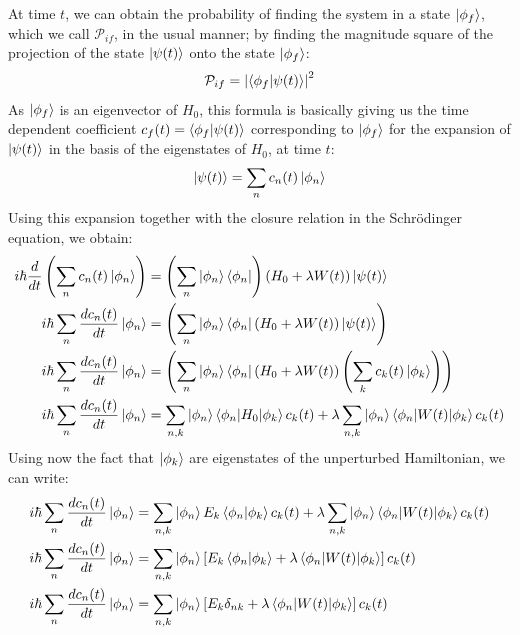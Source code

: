 At time $t$, we can obtain the probability of finding the system in a state $\ket{\phi_f}$, which we call $\mathcal{P}_{if}$, in the usual manner; by finding the magnitude square of the projection of the state $\ket{\psi(t)}$ onto the state $\ket{\phi_f}$:
\begin{equation}
    \mathcal{P}_{if} = \left|\braket{\phi_f|\psi(t)}\right|^2
\end{equation}
As $\ket{\phi_f}$ is an eigenvector of $H_0$, this formula is basically giving us the time dependent coefficient $c_f(t) = \braket{\phi_f|\psi(t)}$ corresponding to $\ket{\phi_f}$ for the expansion of $\ket{\psi(t)}$ in the basis of the eigenstates of $H_0$, at time $t$:
\begin{equation}
    \ket{\psi(t)} = \sum_n c_n(t) \ket{\phi_n}
\end{equation}
Using this expansion together with the closure relation in the Schrödinger equation, we obtain:
\begin{equation}
    \begin{split}
        i\hbar \frac{d}{dt}\left(\sum_n c_n(t) \ket{\phi_n}\right) &= \left( \sum_n \ket{\phi_n}\bra{\phi_n} \right)(H_0 + \lambda W(t)) \ket{\psi(t)}\\
        i\hbar \sum_n\frac{dc_n(t)}{dt} \ket{\phi_n} &= \left( \sum_n \ket{\phi_n}\bra{\phi_n} (H_0 + \lambda W(t)) \ket{\psi(t)}\right)\\
        i\hbar \sum_n\frac{dc_n(t)}{dt} \ket{\phi_n} &= \left( \sum_n \ket{\phi_n}\bra{\phi_n} (H_0 + \lambda W(t)) \left(\sum_k c_k(t) \ket{\phi_k}\right)\right)\\
        i\hbar \sum_n\frac{dc_n(t)}{dt} \ket{\phi_n} &= \sum_{n,k} \ket{\phi_n}\braket{\phi_n| H_0|\phi_k}c_k(t) + \lambda\sum_{n,k} \ket{\phi_n}\braket{\phi_n| W(t)|\phi_k}c_k(t)\\
    \end{split}
\end{equation}
Using now the fact that $\ket{\phi_k}$ are eigenstates of the unperturbed Hamiltonian, we can write:
\begin{equation}
    \begin{split}
        i\hbar \sum_n\frac{dc_n(t)}{dt} \ket{\phi_n} &= \sum_{n,k} \ket{\phi_n}E_k\braket{\phi_n|\phi_k}c_k(t) + \lambda\sum_{n,k} \ket{\phi_n}\braket{\phi_n| W(t)|\phi_k}c_k(t)\\
        i\hbar \sum_n\frac{dc_n(t)}{dt} \ket{\phi_n} &= \sum_{n,k} \ket{\phi_n}\left[E_k\braket{\phi_n|\phi_k} + \lambda\braket{\phi_n| W(t)|\phi_k}\right]c_k(t)\\
        i\hbar \sum_n\frac{dc_n(t)}{dt} \ket{\phi_n} &= \sum_{n,k} \ket{\phi_n}\left[E_k\delta_{nk} + \lambda\braket{\phi_n| W(t)|\phi_k}\right]c_k(t)\\
    \end{split}
\end{equation}
